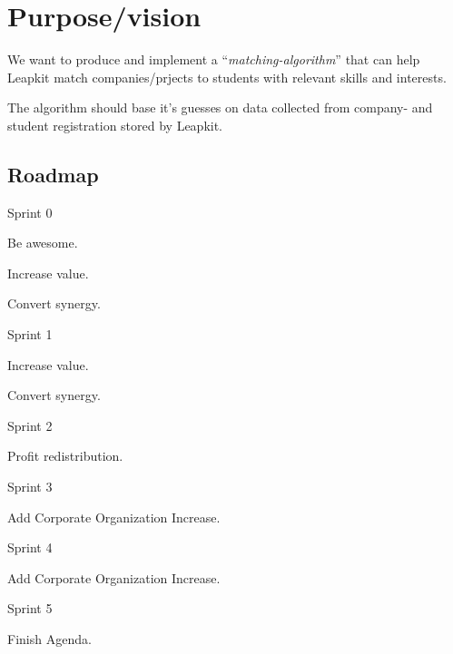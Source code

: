 \section{Purpose/vision}

We want to produce and implement a ``\emph{matching-algorithm}'' that can help
Leapkit match companies/prjects to students with relevant skills and interests.

The algorithm should base it's guesses on data collected from company- and student registration stored by Leapkit.

\subsection{Roadmap}

\begin{enumerate*}
  \item Sprint 0 \\
        \begin{enumerate*}
          \item Be awesome.
          \item Increase value.
          \item Convert synergy.
        \end{enumerate*}
  \item Sprint 1 \\
        \begin{enumerate*}
          \item Increase value.
          \item Convert synergy.
        \end{enumerate*}
  \item Sprint 2 \\
        \begin{enumerate*}
          \item Profit redistribution.
        \end{enumerate*}
  \item Sprint 3 \\
        \begin{enumerate*}
          \item Add Corporate Organization Increase.
        \end{enumerate*}
  \item Sprint 4 \\
        \begin{enumerate*}
          \item Add Corporate Organization Increase.
        \end{enumerate*}
  \item Sprint 5 \\
        \begin{enumerate*}
          \item Finish Agenda.
        \end{enumerate*}
\end{enumerate*}